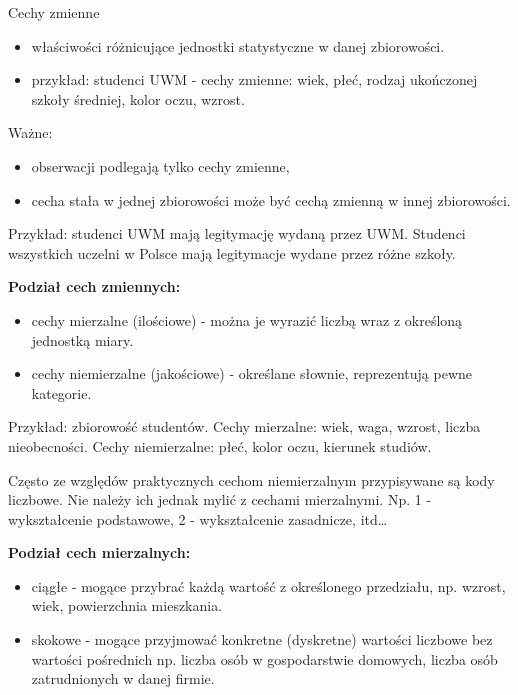 \documentclass[
  polish,
  letterpaper,
  DIV=11,
  numbers=noendperiod]{scrreprt}
\providecommand{\tightlist}{%
  \setlength{\itemsep}{0pt}\setlength{\parskip}{0pt}}
\begin{document}
Cechy zmienne

\begin{itemize}
\tightlist
\item
  właściwości różnicujące jednostki statystyczne w danej zbiorowości.
\item
  przykład: studenci UWM - cechy zmienne: wiek, płeć, rodzaj ukończonej
  szkoły średniej, kolor oczu, wzrost.
\end{itemize}

Ważne:

\begin{itemize}
\tightlist
\item
  obserwacji podlegają tylko cechy zmienne,
\item
  cecha stała w jednej zbiorowości może być cechą zmienną w innej
  zbiorowości.
\end{itemize}

Przykład: studenci UWM mają legitymację wydaną przez UWM. Studenci
wszystkich uczelni w Polsce mają legitymacje wydane przez różne szkoły.

\textbf{Podział cech zmiennych:}

\begin{itemize}
\tightlist
\item
  cechy mierzalne (ilościowe) - można je wyrazić liczbą wraz z określoną
  jednostką miary.
\item
  cechy niemierzalne (jakościowe) - określane słownie, reprezentują
  pewne kategorie.
\end{itemize}

Przykład: zbiorowość studentów. Cechy mierzalne: wiek, waga, wzrost,
liczba nieobecności. Cechy niemierzalne: płeć, kolor oczu, kierunek
studiów.

Często ze względów praktycznych cechom niemierzalnym przypisywane są
kody liczbowe. Nie należy ich jednak mylić z cechami mierzalnymi. Np. 1
- wykształcenie podstawowe, 2 - wykształcenie zasadnicze, itd\ldots{}

\textbf{Podział cech mierzalnych:}

\begin{itemize}
\tightlist
\item
  ciągłe - mogące przybrać każdą wartość z określonego przedziału, np.
  wzrost, wiek, powierzchnia mieszkania.
\item
  skokowe - mogące przyjmować konkretne (dyskretne) wartości liczbowe
  bez wartości pośrednich np. liczba osób w gospodarstwie domowych,
  liczba osób zatrudnionych w danej firmie.
\end{itemize}
\end{document}
